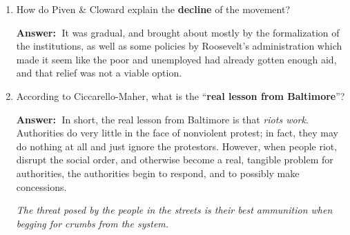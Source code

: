 \documentclass{article}
\newcommand{\answer}{\textbf{Answer:}$\;$}
\begin{document}
\begin{enumerate}[label=\arabic*)]
    \item How do Piven \& Cloward explain the \textbf{decline} of the movement?

    \answer
    It was gradual, and brought about mostly by the formalization of the institutions, as well as some policies by Roosevelt's administration which made it seem like the poor and unemployed had already gotten enough aid, and that relief was not a viable option.
    
    \item According to Ciccarello-Maher, what is the ``\textbf{real lesson from Baltimore}''?

    \answer
    In short, the real lesson from Baltimore is that \textit{riots work}.
    Authorities do very little in the face of nonviolent protest; in fact, they may do nothing at all and just ignore the protestors.
    However, when people riot, disrupt the social order, and otherwise become a real, tangible problem for authorities, the authorities begin to respond, and to possibly make concessions.
    \begin{center}
        \textit{The threat posed by the people in the streets is their best ammunition when begging for crumbs from the system.}
    \end{center}
    
    
\end{enumerate}
 
\end{document}
